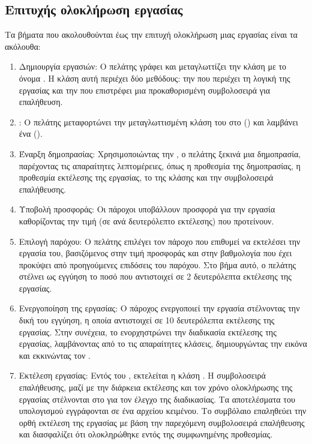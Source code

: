 \subsection{Επιτυχής ολοκλήρωση εργασίας }
Τα βήματα που ακολουθούνται έως την επιτυχή ολοκλήρωση μιας εργασίας είναι τα ακόλουθα:
\begin{enumerate}
    \item Δημιουργία εργασιών: Ο πελάτης γράφει και μεταγλωττίζει την κλάση  με το όνομα \textit{}. Η κλάση αυτή περιέχει δύο  μεθόδους: την \textit{} που περιέχει τη λογική της εργασίας και την \textit{} που επιστρέφει μια προκαθορισμένη συμβολοσειρά για επαλήθευση.
    \item {}: Ο πελάτης μεταφορτώνει την μεταγλωττισμένη κλάση του στο  () και λαμβάνει ένα  ().
    \item Έναρξη δημοπρασίας: Χρησιμοποιώντας την , ο πελάτης ξεκινά μια δημοπρασία, παρέχοντας τις απαραίτητες λεπτομέρειες, όπως η προθεσμία της δημοπρασίας, η προθεσμία εκτέλεσης της εργασίας, το  της  κλάσης και την συμβολοσειρά επαλήθευσης.
    \item Υποβολή προσφοράς: Οι πάροχοι υποβάλλουν προσφορά για την εργασία καθορίζοντας την τιμή (σε  ανά δευτερόλεπτο εκτέλεσης) που προτείνουν.
    \item Επιλογή παρόχου: Ο πελάτης επιλέγει τον πάροχο που επιθυμεί να εκτελέσει την εργασία του, βασιζόμενος στην τιμή προσφοράς και στην βαθμολογία που έχει προκύψει από προηγούμενες επιδόσεις του παρόχου. Στο βήμα αυτό, ο πελάτης στέλνει ως εγγύηση το ποσό που αντιστοιχεί σε 2 δευτερόλεπτα εκτέλεσης της εργασίας.
    \item Ενεργοποίηση της εργασίας: Ο πάροχος ενεργοποιεί την εργασία στέλνοντας την δική του εγγύηση, η οποία αντιστοιχεί σε 10 δευτερόλεπτα εκτέλεσης της εργασίας. Στην συνέχεια, το  ενορχηστρώνει την διαδικασία εκτέλεσης της εργασίας, λαμβάνοντας από το  τις απαραίτητες κλάσεις, δημιουργώντας την εικόνα \textit{} και εκκινώντας τον .
    \item Εκτέλεση εργασίας: Εντός του , εκτελείται η κλάση . Η συμβολοσειρά επαλήθευσης, μαζί με την διάρκεια εκτέλεσης και τον χρόνο ολοκλήρωσης της εργασίας στέλνονται στο  \textit{} για τον έλεγχο της διαδικασίας. Τα αποτελέσματα του υπολογισμού εγγράφονται σε ένα αρχείου κειμένου. Το συμβόλαιο επαληθεύει την ορθή εκτέλεση της εργασίας με βάση την παρεχόμενη συμβολοσειρά επαλήθευσης και διασφαλίζει ότι ολοκληρώθηκε εντός της συμφωνημένης προθεσμίας.

\end{enumerate}
